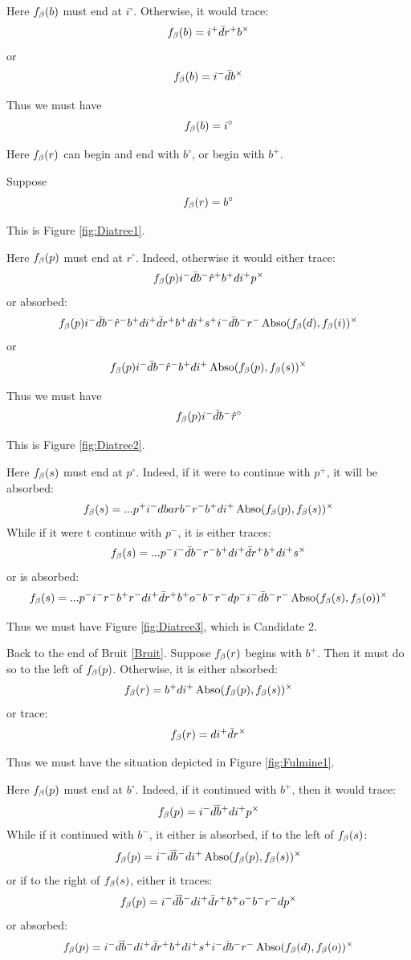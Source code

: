 Here $f_\beta(b)$ must end at $i^\circ$. Otherwise, it would trace:
\[
f_\beta(b) = i^+ \bar{d} r^+ b^\times
\]
or
\[
f_\beta(b) = i^- \bar{d} b^\times
\]

Thus we must have
\[
f_\beta(b) = i^\circ
\]

Here $f_\beta(r)$ can begin and end with $b^\circ$, or begin with $b^+$.

\label{Diatree}
Suppose 
\[
f_\beta(r) = b^\circ
\]

This is Figure \ref{fig:Diatree1}.

Here $f_\beta(p)$ must end at $r^\circ$. Indeed, otherwise it would either trace:
\[
f_\beta(p) i^- \bar{d} b^- \hat{r}^+ b^+ d i^+ p^\times
\]
or absorbed:
\[
f_\beta(p) i^- \bar{d} b^- \hat{r}^- b^+ d i^+ \bar{d} r^+ b^+ d i^+ s^+ i^- \bar{d} b^- r^- \operatorname{Abso}(f_\beta(d), f_\beta(i))^\times
\]
or
\[
f_\beta(p) i^- \bar{d} b^- \hat{r}^- b^+ d i^+ \operatorname{Abso}(f_\beta(p), f_\beta(s))^\times
\]

Thus we must have
\[
f_\beta(p) i^- \bar{d} b^- \hat{r}^\circ
\]

This is Figure \ref{fig:Diatree2}.

Here $f_\beta(s)$ must end at $p^\circ$. Indeed, if it were to continue with $p^+$, it will be absorbed:
\[
f_\beta(s) =... p^+ i^- dbar b^- r^- b^+ d i^+ \operatorname{Abso}(f_\beta(p), f_\beta(s))^\times
\]
While if it were t continue with $p^-$, it is either traces:
\[
f_\beta(s) =...p^- i^- \bar{d} b^- r^- b^+ d i^+ \bar{d} r^+ b^+ d i^+ s^\times
\]
or is absorbed:
\[
f_\beta(s)=...p^- i^- r^- b^+ r^- d i^+ \bar{d} r^+ b^+ o^- b^- r^- d p^- i^- \bar{d} b^- r^- \operatorname{Abso}(f_\beta(s), f_\beta(o))^\times
\]

Thus we must have Figure \ref{fig:Diatree3}, which is Candidate 2.

\label{Fulmine}
Back to the end of Bruit \ref{Bruit}. Suppose $f_\beta(r)$ begins with $b^+$. Then it must do so to the left of $f_\beta(p)$. Otherwise, it is either absorbed:
\[
f_\beta(r) = b^+ d i^+ \operatorname{Abso}(f_\beta(p), f_\beta(s))^\times
\]
or trace:
\[
f_\beta(r) = d i^+ \bar{d} r ^\times
\]

Thus we must have the situation depicted in Figure \ref{fig:Fulmine1}.

Here $f_\beta(p)$ must end at $b^\circ$. Indeed, if it continued with $b^+$, then it would trace:
\[
f_\beta(p) = i^- \bar{d} \hat{b}^+ d i^+ p^\times
\]
While if it continued with $b^-$, it either is absorbed, if to the left of $f_\beta(s)$:
\[
f_\beta(p) = i^- \bar{d} \hat{b}^- d i^+ \operatorname{Abso}(f_\beta(p), f_\beta(s))^\times
\]
or if to the right of $f_\beta(s)$, either it traces:
\[
f_\beta(p) = i^- \bar{d} \hat{b}^- d i^+ \bar{d} r^+ b^+ o^- b^- r^- d p^\times
\]
or absorbed:
\[
f_\beta(p) = i^- \bar{d} \hat{b}^- d i^+ \bar{d} r^+ b^+ d i^+ s^+ i^- \bar{d} b^- r^- \operatorname{Abso}(f_\beta(d), f_\beta(o))^\times
\]

